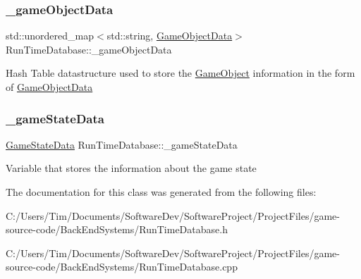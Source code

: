 \subsubsection{\texorpdfstring{\+\_\+game\+Object\+Data}{\_gameObjectData}}
{\footnotesize\ttfamily std\+::unordered\+\_\+map$<$std\+::string, \hyperlink{struct_game_object_data}{Game\+Object\+Data}$>$ Run\+Time\+Database\+::\+\_\+game\+Object\+Data\hspace{0.3cm}{\ttfamily [protected]}}

Hash Table datastructure used to store the \hyperlink{class_game_object}{Game\+Object} information in the form of \hyperlink{struct_game_object_data}{Game\+Object\+Data} \mbox{\label{class_run_time_database_a1d965e094a4035d1a6c28a566a29cb8e}} 
\subsubsection{\texorpdfstring{\+\_\+game\+State\+Data}{\_gameStateData}}
{\footnotesize\ttfamily \hyperlink{struct_game_state_data}{Game\+State\+Data} Run\+Time\+Database\+::\+\_\+game\+State\+Data\hspace{0.3cm}{\ttfamily [protected]}}

Variable that stores the information about the game state 

The documentation for this class was generated from the following files\+:\begin{DoxyCompactItemize}
\item 
C\+:/\+Users/\+Tim/\+Documents/\+Software\+Dev/\+Software\+Project/\+Project\+Files/game-\/source-\/code/\+Back\+End\+Systems/Run\+Time\+Database.\+h\item 
C\+:/\+Users/\+Tim/\+Documents/\+Software\+Dev/\+Software\+Project/\+Project\+Files/game-\/source-\/code/\+Back\+End\+Systems/Run\+Time\+Database.\+cpp\end{DoxyCompactItemize}
